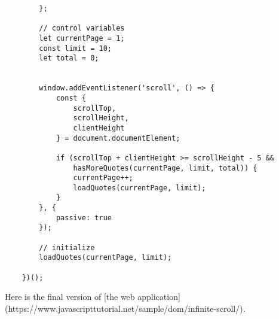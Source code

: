 \documentclass[11pt]{article}
\begin{document}
\begin{lstlisting}
        };

        // control variables
        let currentPage = 1;
        const limit = 10;
        let total = 0;


        window.addEventListener('scroll', () => {
            const {
                scrollTop,
                scrollHeight,
                clientHeight
            } = document.documentElement;

            if (scrollTop + clientHeight >= scrollHeight - 5 &&
                hasMoreQuotes(currentPage, limit, total)) {
                currentPage++;
                loadQuotes(currentPage, limit);
            }
        }, {
            passive: true
        });

        // initialize
        loadQuotes(currentPage, limit);

    })();
\end{lstlisting}

Here is the final version of [the web application](https://www.javascripttutorial.net/sample/dom/infinite-scroll/).
\end{document}
